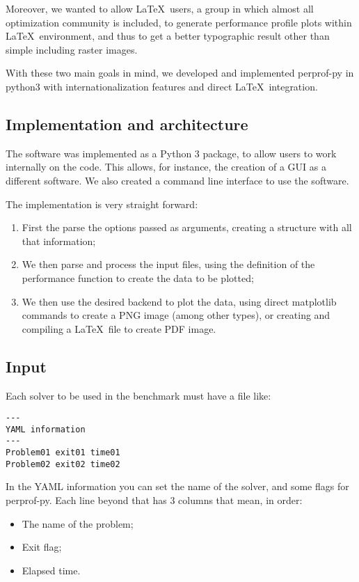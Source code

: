     Moreover,  we wanted to allow \LaTeX\ users, a group in which almost all
    optimization community is included,  to   generate performance profile plots
    within \LaTeX\ environment, and thus to get a better typographic result other
    than simple including raster  images.

    With these two main goals in mind, we developed and implemented perprof-py
    in python3 with internationalization features and direct \LaTeX\ integration.

\subsection*{Implementation and architecture}

    The software was implemented as a Python 3 package, to allow users to work
    internally on the code. This allows, for instance, the creation of a GUI
    as a different software. We also created a command line interface to use the
    software.

    The implementation is very straight forward:
    \begin{enumerate}
      \item First the parse the options passed as arguments, creating a
        structure with all that information;
      \item We then parse and process the input files, using the definition
        of the performance function to create the data to be plotted;
      \item We then use the desired backend to plot the data, using direct
        matplotlib commands to create a PNG image (among other types), or
        creating and compiling a \LaTeX\ file to create PDF image.
    \end{enumerate}

\subsection*{Input}

    Each solver to be used in the benchmark must have a file like:

    \begin{verbatim}
---
YAML information
---
Problem01 exit01 time01
Problem02 exit02 time02
    \end{verbatim}

    In the YAML information you can set the name of the solver, and some
    flags for perprof-py.
    Each line beyond that has 3 columns that mean, in order:
    \begin{itemize}
      \item The name of the problem;
      \item Exit flag;
      \item Elapsed time.
    \end{itemize}

